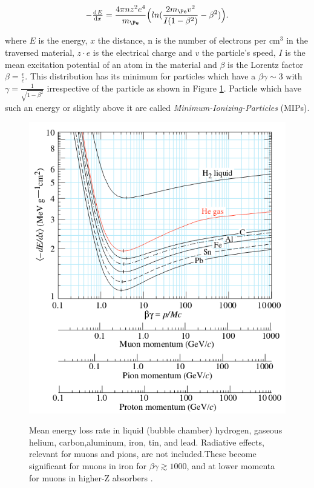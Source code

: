 \begin{equation}
-\od{E}{x}=\frac{4\pi n z^2 e^4}{m_{\Pe}}\Big(ln(\frac{2m_{\Pe}v^2}{I(1-\beta^2)}-\beta^2)  \Big).
\end{equation}

where $E$ is the energy, $x$ the distance, n is the number of electrons per $\text{cm}^3$ in the traversed material, $z \cdot e$ is the electrical charge and $v$ the particle's speed, $I$ is the mean excitation potential of an atom in the material and $\beta$ is the Lorentz factor $\beta = \frac{v}{c}$. This distribution has its minimum for particles which have a $\beta\gamma \sim 3$ with $\gamma=\frac{1}{\sqrt{1-\beta^2}}$ irrespective of the particle as shown in Figure \ref{fig:BB}. Particle which have such an energy or slightly above it are called \textit{Minimum-Ionizing-Particles} (MIPs).

\begin{figure}[htbp]
\centering
\includegraphics[width=\linewidth]{./fig/BB.png}
\label{fig:BB}
\caption{Mean energy loss rate in liquid (bubble chamber) hydrogen, gaseous helium, carbon,aluminum, iron, tin, and lead. Radiative effects, relevant for muons and pions, are not included.These become significant for muons in iron for $\beta\gamma \gtrsim 1000$, and at lower momenta for muons in higher-Z absorbers \cite{Tanabashi:2018oca}.}
\end{figure}


